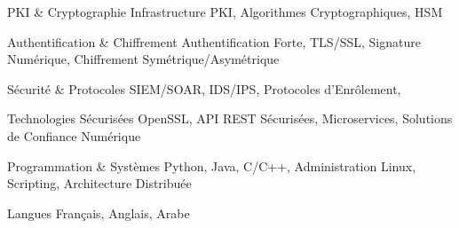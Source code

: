 

\begin{cvskills}

    \cvskill
    {PKI \& Cryptographie} %
    {Infrastructure PKI, Algorithmes Cryptographiques, HSM} %

    \cvskill
    {Authentification \& Chiffrement} %
    {Authentification Forte, TLS/SSL, Signature Numérique, Chiffrement Symétrique/Asymétrique} %

    \cvskill
    {Sécurité \& Protocoles} %
    {SIEM/SOAR, IDS/IPS, Protocoles d'Enrôlement,} %

    \cvskill
    {Technologies Sécurisées} %
    {OpenSSL, API REST Sécurisées, Microservices, Solutions de Confiance Numérique} %

    \cvskill
    {Programmation \& Systèmes} %
    {Python, Java, C/C++, Administration Linux, Scripting, Architecture Distribuée} %

    \cvskill
    {Langues} %
    {Français, Anglais, Arabe} %

\end{cvskills}
